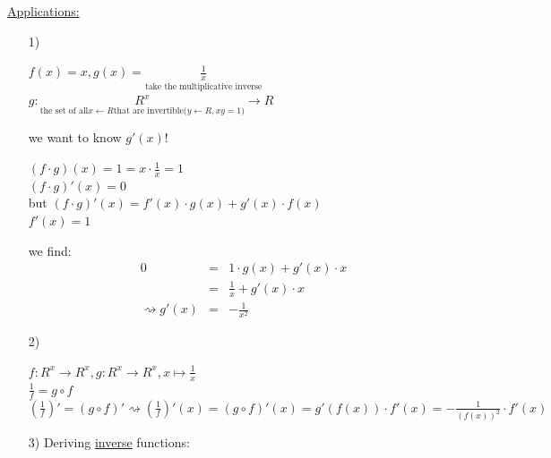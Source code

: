 \documentclass[a4paper, 12pt]{article}
\begin{document}
\underline{Applications:}\\
\begin{enumerate}
\item[1)]
\begin{center}
$f(x) = x, g(x) = \underset{\text{take the multiplicative inverse}}{\frac{1}{x}}$\\
$ g:\underset{\text{the set of all}x \leftarrow R\text{that are invertible(}y \leftarrow R, xy = 1\text{)}}{R^x}\rightarrow R$\\
\end{center}
we want to know $g'(x)$!\\
\begin{multicols}{2}
\begin{center}
$(f \cdot g)(x) = 1 = x \cdot \frac{1}{x} = 1$\\
$(f \cdot g)'(x) = 0$\\
but $(f \cdot g)'(x) = f'(x) \cdot g(x) + g'(x) \cdot f(x)$\\
$f'(x) = 1$\\
\end{center}
we find:
\begin{eqnarray*}
0 &=& 1 \cdot g(x) + g'(x) \cdot x\\
&=& \frac{1}{x} + g'(x) \cdot x\\
\rightsquigarrow g'(x)& = &-\frac{1}{x^2}
\end{eqnarray*}
\begin{center}
\end{center}
\end{multicols}
\item[2)]
\begin{center}
$f:R^x \rightarrow R^x, g:R^x \rightarrow R^x, x \mapsto \frac{1}{x}$\\
$\frac{1}{f} = g\circ f$\\
$(\frac{1}{f})' = (g\circ f)' \rightsquigarrow (\frac{1}{f})'(x) = (g\circ f)'(x) = g'(f(x))\cdot f'(x) = -\frac{1}{(f(x))^2}\cdot f'(x)$\\
\end{center}
\item[3)] Deriving \underline{inverse} functions:
\begin{multicols}{2}
\begin{center}

\end{center}
\end{multicols}
\end{enumerate}
\end{document}
